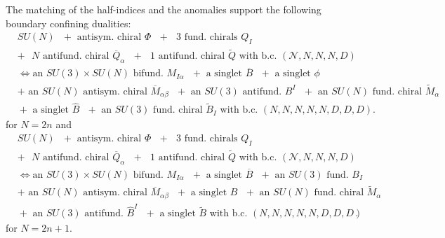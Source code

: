\documentclass[12pt]{article}
\numberwithin{equation}{section}
\begin{document}
The matching of the half-indices and the anomalies support the following boundary confining dualities: 
\begin{align}
\label{bdy_SUN_AS_3_N_dual1}
&\textrm{$SU(N)$ $+$ antisym. chiral $\Phi$ $+$ $3$ fund. chirals $Q_{I}$}
\nonumber\\
&\textrm{$+$ $N$ antifund. chiral $\overline{Q}_{\alpha}$ $+$ $1$ antifund. chiral $\widetilde{Q}$ with b.c. $(\mathcal{N},N,N,N,D)$}
\nonumber\\
&\Leftrightarrow 
\textrm{
an $SU(3)\times SU(N)$ bifund. $M_{I \alpha}$ $+$ a singlet $\overline{B}$ $+$ a singlet $\phi$}
\nonumber\\
&\textrm{$+$ an $SU(N)$ antisym. chiral $\overline{M}_{\alpha\beta}$ $+$ an $SU(3)$ antifund. $B^I$ 
$+$ an $SU(N)$ fund. chiral $\widetilde{M}_{\alpha}$}
\nonumber\\
&\textrm{
$+$ a singlet $\widehat{B}$ $+$ an $SU(3)$ fund. chiral $\widetilde{B}_I$ with b.c. $(N,N,N,N,N,D,D,D)$}. 
\end{align}
for $N=2n$ and
%
\begin{align}
\label{bdy_SUN_AS_3_N_dual2}
&\textrm{$SU(N)$ $+$ antisym. chiral $\Phi$ $+$ $3$ fund. chirals $Q_{I}$}
\nonumber\\
&\textrm{$+$ $N$ antifund. chiral $\overline{Q}_{\alpha}$ $+$ $1$ antifund. chiral $\widetilde{Q}$ with b.c. $(\mathcal{N},N,N,N,D)$}
\nonumber\\
&\Leftrightarrow 
\textrm{
an $SU(3)\times SU(N)$ bifund. $M_{I \alpha}$ $+$ a singlet $\overline{B}$ $+$ an $SU(3)$ fund. $B_I$}
\nonumber\\
&\textrm{$+$ an $SU(N)$ antisym. chiral $\overline{M}_{\alpha\beta}$ $+$ a singlet $B$ 
$+$ an $SU(N)$ fund. chiral $\widetilde{M}_{\alpha}$}
\nonumber\\
&\textrm{
$+$ an $SU(3)$ antifund. $\widehat{B}^I$ $+$ a singlet $\widetilde{B}$ with b.c. $(N,N,N,N,N,D,D,D)$}. 
\end{align}
for $N=2n+1$. 
\end{document}
